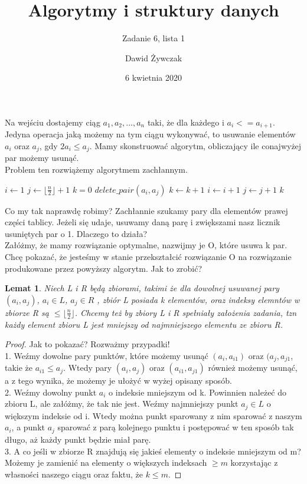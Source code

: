 \documentclass[a4paper]{scrartcl}
\title{Algorytmy i struktury danych}
\subtitle{Zadanie 6, lista 1}
\author{Dawid Żywczak}
\date{6 kwietnia 2020}
\newtheorem{lemma}{Lemat}
\begin{document}
\maketitle
Na wejściu dostajemy ciąg $a_1, a_2, ..., a_n$ taki, że dla każdego i $a_i <= a_{i+1}$. Jedyna operacja jaką możemy na tym ciągu wykonywać, to usuwanie elementów $a_i$ oraz $a_j$, gdy $2a_i \leq a_j$. Mamy skonstruować algorytm, obliczający ile conajwyżej par możemy usunąć.\\
Problem ten rozwiążemy algorytmem zachłannym.\\
\begin{algorithmic}
\STATE $i\gets 1$
\STATE $j \gets \lfloor \frac{n}{2} \rfloor +1$
\STATE $k = 0$
        	\STATE $delete\_pair(a_i, a_j)$
        	\STATE $k \gets k+1$
        	\STATE $i \gets i+1$
		\ENDIF
        \STATE $j \gets j+1$
\ENDWHILE
\RETURN $k$
\end{algorithmic}
Co my tak naprawdę robimy? Zachłannie szukamy pary dla elementów prawej części tablicy. Jeżeli się udaje, usuwamy daną parę i zwiększami nasz licznik usuniętych par o 1. Dlaczego to działa?\\
Załóżmy, że mamy rozwiązanie optymalne, nazwijmy je O, które usuwa k par. Chcę pokazać, że jesteśmy w stanie przekształcić rozwiązanie O na rozwiązanie produkowane przez powyższy algorytm. Jak to zrobić?
\begin{lemma}
Niech L i R będą zbiorami, takimi że dla dowolnej usuwanej pary $(a_i, a_j)$, $a_i \in L$, $a_j \in R$ , zbiór L posiada k elementów, oraz indeksy elemntów w zbiorze R są $\leq \lfloor \frac{n}{2} \rfloor$. Chcemy też by zbiory L i R spełniały założenia zadania, tzn każdy element zbioru L jest mniejszy od najmniejszego elementu ze zbioru R.
\end{lemma}
\begin{proof}
Jak to pokazać? Rozważmy przypadki!\\
1. Weźmy dowolne pary punktów, które możemy usunąć $(a_{i}, a_{i1})$ oraz $(a_j, a_{j1}$, takie że $a_{i1} \leq a_j$. Wtedy pary $(a_i, a_j)$ oraz $(a_{i1}, a_{j1})$ również możemy usunąć, a z tego wynika, że możemy je ułożyć w wyżej opisany sposób.\\
2. Weźmy dowolny punkt $a_i$ o indeksie mniejszym od k. Powinnien należeć do zbioru L, ale załóżmy, że tak nie jest. Weźmy najmniejszy punkt $a_j \in L$ o większym indeksie od i. Wtedy można punkt sparowany z nim sparować z naszym $a_i$, a punkt $a_j$ sparować z parą kolejnego punktu i postępować w ten sposób tak długo, aż każdy punkt będzie miał parę.\\
3. A co jeśli w zbiorze R znajdują się jakieś elementy o indeksie mniejszym od m? Możemy je zamienić na elementy o większych indeksach $\geq m$ korzystając z własności naszego ciągu oraz faktu, że $k \leq m$.
\end{proof}
\end{document}

